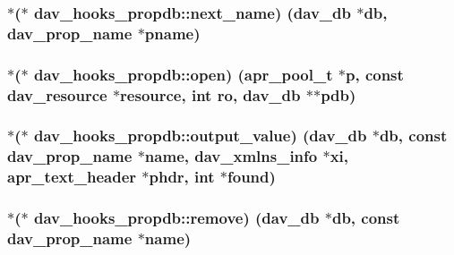 \subsubsection[{\texorpdfstring{next\+\_\+name}{next_name}}]{$\ast$($\ast$ dav\+\_\+hooks\+\_\+propdb\+::next\+\_\+name) ({\bf dav\+\_\+db} $\ast$db, {\bf dav\+\_\+prop\+\_\+name} $\ast$pname)}\hypertarget{structdav__hooks__propdb_a39e972ee0f305da65f5d03dedea9f587}{}\label{structdav__hooks__propdb_a39e972ee0f305da65f5d03dedea9f587}
\subsubsection[{\texorpdfstring{open}{open}}]{$\ast$($\ast$ dav\+\_\+hooks\+\_\+propdb\+::open) ({\bf apr\+\_\+pool\+\_\+t} $\ast${\bf p}, const {\bf dav\+\_\+resource} $\ast${\bf resource}, {\bf int} {\bf ro}, {\bf dav\+\_\+db} $\ast$$\ast$pdb)}\hypertarget{structdav__hooks__propdb_ae447136ce49c986fb7c3c84a331e066e}{}\label{structdav__hooks__propdb_ae447136ce49c986fb7c3c84a331e066e}
\subsubsection[{\texorpdfstring{output\+\_\+value}{output_value}}]{$\ast$($\ast$ dav\+\_\+hooks\+\_\+propdb\+::output\+\_\+value) ({\bf dav\+\_\+db} $\ast$db, const {\bf dav\+\_\+prop\+\_\+name} $\ast${\bf name}, {\bf dav\+\_\+xmlns\+\_\+info} $\ast$xi, {\bf apr\+\_\+text\+\_\+header} $\ast${\bf phdr}, {\bf int} $\ast${\bf found})}\hypertarget{structdav__hooks__propdb_a203b6da3e9f82c0e3158461bf1a50b8d}{}\label{structdav__hooks__propdb_a203b6da3e9f82c0e3158461bf1a50b8d}
\subsubsection[{\texorpdfstring{remove}{remove}}]{$\ast$($\ast$ dav\+\_\+hooks\+\_\+propdb\+::remove) ({\bf dav\+\_\+db} $\ast$db, const {\bf dav\+\_\+prop\+\_\+name} $\ast${\bf name})}\hypertarget{structdav__hooks__propdb_a9aefad972daa1f480c897101d10a6b86}{}\label{structdav__hooks__propdb_a9aefad972daa1f480c897101d10a6b86}
